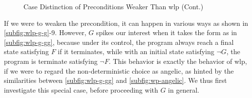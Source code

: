 \begin{figure}[ht]\centering
	\ContinuedFloat
	\hfill

	\hfill
\caption{Case Distinction of Preconditions Weaker Than wlp (Cont.) }
\label{fig:wlp-g-2}
\end{figure}
If we were to weaken the precondition, it can happen in various ways as shown in \autoref{subfig:wlp-g-g}{\color{RoyalBlue}-9}. 
However, $G$ spikes our interest when it takes the form as in \autoref{subfig:wlp-g-gg}, because under its control, the program always  reach a final state satisfying $F$ if it terminates, while with an initial state satisfying $\neg G$, the program is  terminate satisfying $\neg F$. 
This behavior is exactly the behavior of wlp, if we were to regard the non-deterministic choice as angelic, as hinted by the similarities between \autoref{subfig:wlp-g-gg} and \autoref{subfig:wp-angelic}. 
We thus first investigate this special case, before proceeding with $G$ in general. 

